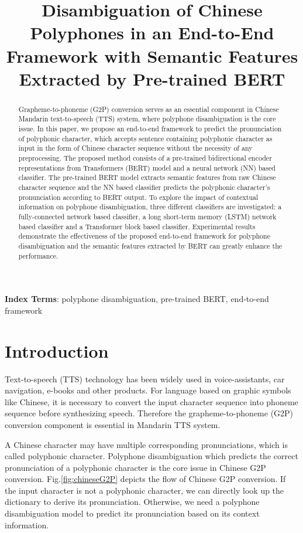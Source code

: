 \documentclass[a4paper]{article}
\title{Disambiguation of Chinese Polyphones in an End-to-End Framework with Semantic Features Extracted by Pre-trained BERT}
\begin{document}
\maketitle
% 
\begin{abstract}
Grapheme-to-phoneme (G2P) conversion serves as an essential component in Chinese Mandarin text-to-speech (TTS) system, where polyphone disambiguation is the core issue. In this paper, we propose an end-to-end framework to predict the pronunciation of polyphonic character, which accepts sentence containing polyphonic character as input in the form of Chinese character sequence without the necessity of any preprocessing. The proposed method consists of a pre-trained bidirectional encoder representations from Transformers (BERT) model and a neural network (NN) based classifier. The pre-trained BERT model extracts semantic features from raw Chinese character sequence and the NN based classifier predicts the polyphonic character's pronunciation according to BERT output. To explore the impact of contextual information on polyphone disambiguation, three different classifiers are investigated: a fully-connected network based classifier, a long short-term memory (LSTM) network based classifier and a Transformer block based classifier. Experimental results demonstrate the effectiveness of the proposed end-to-end framework for polyphone disambiguation and the semantic features extracted by BERT can greatly enhance the performance.
\end{abstract}

\noindent\textbf{Index Terms}: polyphone disambiguation, pre-trained BERT, end-to-end framework

\section{Introduction}


Text-to-speech (TTS) technology has been widely used in voice-assistants, car navigation, e-books and other products. For language based on graphic symbols like Chinese, it is necessary to convert the input character sequence into phoneme sequence before synthesizing speech. Therefore the grapheme-to-phoneme (G2P) conversion component is essential in Mandarin TTS system. 


A Chinese character may have multiple corresponding pronunciations, which is called polyphonic character. Polyphone disambiguation which predicts the correct pronunciation of a polyphonic character is the core issue in Chinese G2P conversion. Fig.\ref{fig:chineseG2P} depicts the flow of Chinese G2P conversion. If the input character is not a polyphonic character, we can directly look up the dictionary to derive its pronunciation. Otherwise, we need a polyphone disambiguation model to predict its pronunciation based on its context information.
\end{document}

